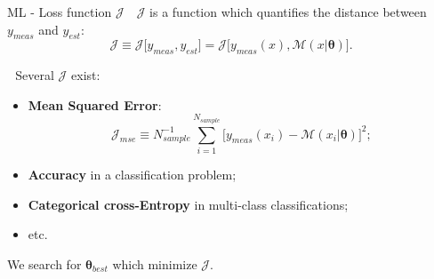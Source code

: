 \documentclass[8pt, xcolor={svgnames}, hyperref={colorlinks,linkcolor=black, citecolor=amethyst, urlcolor=amethyst}]{beamer}
\begin{document}
\begin{frame}{ML - Loss function $\mathcal{J}$}
\large
    \faArrowCircleRight\,\, $\mathcal{J}$ is a function which quantifies the 
    distance between $y_{meas}$ and $y_{est}$:
    $$\mathcal{J} \equiv \mathcal{J}\bigl[y_{meas}, y_{est}\bigr] = \mathcal{J}\bigl[y_{meas}(x), \mathcal{M}(x| \bm{\theta})\bigr].$$

\pause
\faArrowCircleRight\,\, Several $\mathcal{J}$ exist:
\begin{itemize}
    \item[\tiny\faCircle] \textbf{Mean Squared Error}: 
    $$ \mathcal{J}_{mse} \equiv N_{sample}^{-1}\sum_{i=1}^{N_{sample}} \bigl[y_{meas}(x_i) - \mathcal{M}(x_i| \bm{\theta})\bigr]^2;$$
    \item[\tiny\faCircle] \textbf{Accuracy} in a classification problem;
    \item[\tiny\faCircle] \textbf{Categorical cross-Entropy} in multi-class classifications;
    \item[\tiny\faCircle] etc.
\end{itemize}

\pause

\vspace{0.5cm}
\begin{tcolorbox}[colback=amethyst!20, title=Optimization goal]
We search for $\bm{\theta}_{best}$ which minimize $\mathcal{J}$.
\end{tcolorbox}
    
\end{frame}
\end{document}
